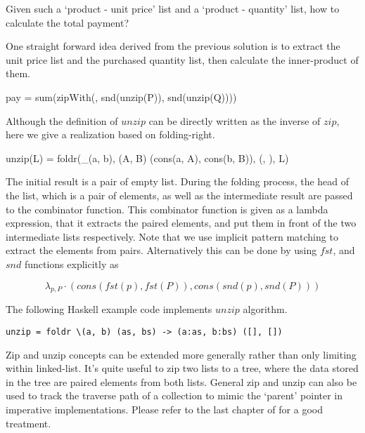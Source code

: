 \documentclass{article}
\begin{document}
Given such a `product - unit price' list and a `product - quantity' list, how to calculate the total payment?

One straight forward idea derived from the previous solution is to extract the unit price list and the purchased
quantity list, then calculate the inner-product of them.

\be
pay = sum(zipWith(\times, snd(unzip(P)), snd(unzip(Q))))
\ee

Although the definition of $unzip$ can be directly written as the inverse of $zip$, here we give a realization based on
folding-right.

\be
unzip(L) = foldr(\lambda_{(a, b), (A, B)} \cdot (cons(a, A), cons(b, B)), (\Phi, \Phi), L)
\ee

The initial result is a pair of empty list. During the folding process, the head of the list, which is a pair
of elements, as well as the intermediate result are passed to the combinator function. This combinator function
is given as a lambda expression, that it extracts the paired elements, and put them in front of the two
intermediate lists respectively. Note that we use implicit pattern matching to extract the elements from 
pairs. Alternatively this can be done by using $fst$, and $snd$ functions explicitly as 

\[
\lambda_{p, P} \cdot (cons(fst(p), fst(P)), cons(snd(p), snd(P)))
\]

The following Haskell example code implements $unzip$ algorithm.

\lstset{language=Haskell}
\begin{lstlisting}
unzip = foldr \(a, b) (as, bs) -> (a:as, b:bs) ([], [])
\end{lstlisting}

Zip and unzip concepts can be extended more generally rather than only limiting within linked-list. It's quite
useful to zip two lists to a tree, where the data stored in the tree are paired elements from both lists.
General zip and unzip can also be used to track the traverse path of a collection to mimic the `parent' pointer
in imperative implementations. Please refer to the last chapter of \cite{learn-haskell} for a good treatment.
\end{document}
